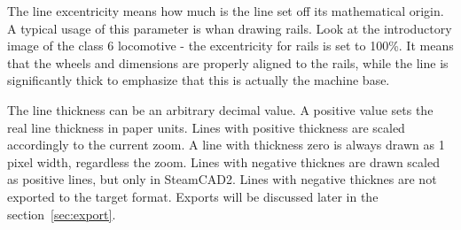 The line excentricity means how much is the line set off its mathematical origin.
A typical usage of this parameter is whan drawing rails. Look at the introductory
image of the class 6 locomotive - the excentricity for rails is set to 100\%.
It means that the wheels and dimensions are properly aligned to the rails, while
the line is significantly thick to emphasize that this is actually the machine
base.

The line thickness can be an arbitrary decimal value. A positive value sets the
real line thickness in paper units. Lines with positive thickness are scaled
accordingly to the current zoom. A line with thickness zero is always drawn
as 1 pixel width, regardless the zoom. Lines with negative thicknes are drawn
scaled as positive lines, but only in SteamCAD2. Lines with negative
thicknes are not exported to the target format. Exports will be discussed later
in the section~\ref{sec:export}.


